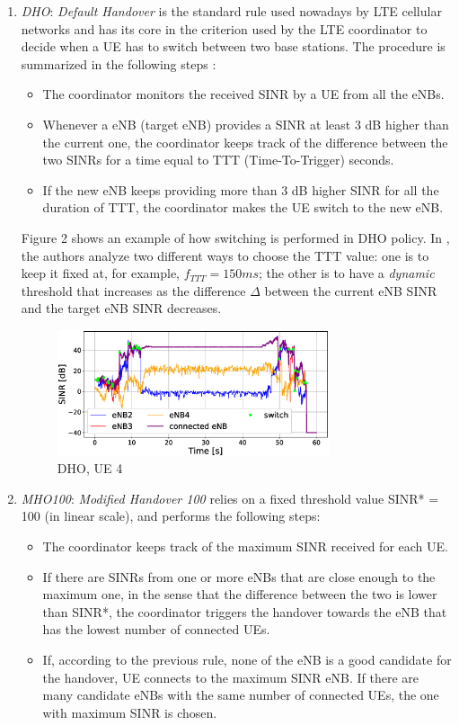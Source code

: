 \documentclass[conference,10pt]{IEEEtran}
\begin{document}
\begin{enumerate}
\item \emph{DHO}: \emph{Default Handover} is the standard rule used nowadays by LTE cellular networks and has its core in the criterion used by the LTE coordinator to decide when a UE has to switch between two base stations. The procedure is summarized in the following steps \cite{imphand}:

\begin{itemize}
	\item The coordinator monitors the received SINR by a UE from all the eNBs.
	\item Whenever a eNB (target eNB) provides a SINR at least 3 dB higher than the current one, the coordinator keeps track of the difference between the two SINRs for a time equal to TTT (Time-To-Trigger) seconds.
	\item If the new eNB keeps providing more than 3 dB higher SINR for all the duration of TTT, the coordinator makes the UE switch to the new eNB.
\end{itemize}
Figure 2 shows an example of how switching is performed in DHO policy. In \cite{imphand}, the authors analyze two different ways to choose the TTT value: one is to keep it fixed at, for example, $f_{TTT}=150ms$; the other is to have a \emph{dynamic} threshold that increases as the difference $\Delta$ between the current eNB SINR and the target eNB SINR decreases.

\begin{figure}[h]
	\begin{center}    
		\includegraphics[width=8cm, keepaspectratio]{images/ue4_switch_dho.eps}
		\caption{DHO, UE 4}
	\end{center}
\end{figure}

\item \emph{MHO100}:
\emph{Modified Handover 100} relies on a fixed threshold value SINR* = 100 (in linear scale), and performs the following steps:

\begin{itemize}
	\item The coordinator keeps track of the maximum SINR received for each UE.
	\item If there are SINRs from one or more eNBs that are close enough to the maximum one, in the sense that the difference between the two is lower than SINR*, the coordinator triggers the handover towards the eNB that has the lowest number of connected UEs.
	\item If, according to the previous rule, none of the eNB is a good candidate for the handover, UE connects to the maximum SINR eNB. If there are many candidate eNBs with the same number of connected UEs, the one with maximum SINR is chosen.
\end{itemize}


\end{enumerate}
\end{document}
